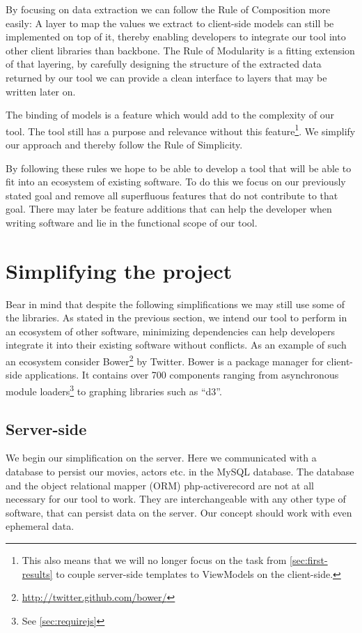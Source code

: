 \documentclass[thesis.tex]{subfiles}
\begin{document}
By focusing on data extraction we can follow the Rule of Composition more
easily: A layer to map the values we extract to client-side models can still be
implemented on top of it, thereby enabling developers to integrate our tool into
other client libraries than backbone.
The Rule of Modularity is a fitting extension of that layering, by carefully
designing the structure of the extracted data returned by our tool we can
provide a clean interface to layers that may be written later on.

The binding of models is a feature which would add to the complexity of our
tool. The tool still has a purpose and relevance without this feature\footnote{
	This also means that we will no longer focus on the task from
	\ref{sec:first-results} to couple server-side templates to ViewModels on the
	client-side.
}.
We simplify our approach and thereby follow the Rule of Simplicity.

By following these rules we hope to be able to develop a tool that will be able
to fit into an ecosystem of existing software. To do this we focus on our
previously stated goal and remove all superfluous features that do not
contribute to that goal. There may later be feature additions that can help the
developer when writing software and lie in the functional scope of our tool.

\section{Simplifying the project}
\label{sec:simplifying}
Bear in mind that despite the following simplifications we may still use some
of the libraries.
As stated in the previous section, we intend our tool to perform in an ecosystem
of other software, minimizing dependencies can help developers integrate it into
their existing software without conflicts. As an example of such an ecosystem
consider Bower\footnote{\url{http://twitter.github.com/bower/}} by Twitter.
Bower is a package manager for client-side applications. It contains over 700
components ranging from asynchronous module loaders\footnote{
See \ref{sec:requirejs}} to graphing libraries such as ``d3''.

\subsection{Server-side}
We begin our simplification on the server. Here we communicated with a database
to persist our movies, actors etc. in the MySQL database. The database and the
object relational mapper (ORM) php-activerecord are not at all necessary for our
tool to work. They are interchangeable with any other type of software, that can
persist data on the server. Our concept should work with even ephemeral data.
\end{document}

